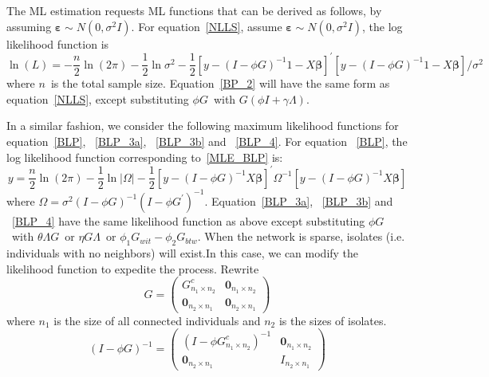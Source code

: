 \documentclass[nojss]{jss}
\begin{document}
The ML estimation requests ML functions that can be derived as follows, by assuming $\mathbf{\varepsilon}\sim N(0,\sigma ^{2}I).$ For equation~\ref{NLLS}, assume $\mathbf{\varepsilon }\sim N(0,\sigma ^{2}I)$, the log likelihood function is
\begin{equation}
\ln \left( L\right) =-\frac{n}{2}\ln \left( 2\pi \right) -\frac{1}{2}\ln
\sigma ^{2}-\frac{1}{2}\left[y-(I-\phi G)^{-1}1-X\mathbf{\beta }%
\right] ^{\prime }\left[ y-(I-\phi G)^{-1}1-X\mathbf{\beta }\right]
/\sigma ^{2}
\end{equation}
where $n$\ is the total sample size. Equation~\ref{BP_2} will have the same form as equation~\ref{NLLS}, except substituting $\phi G$\ with $G(\phi I+\gamma \Lambda)$.

In a similar fashion, we consider the following maximum likelihood functions for equation~\ref{BLP}, ~\ref{BLP_3a}, ~\ref{BLP_3b} and ~\ref{BLP_4}.
For equation ~\ref{BLP}, the log likelihood function corresponding to~\ref{MLE_BLP} is:
\begin{equation}
y=\frac{n}{2}\ln \left( 2\pi \right) -\frac{1}{2}\ln |\Omega |-\frac{1}{2}%
\left[ y-(I-\phi G)^{-1}X\mathbf{\beta }\right] ^{\prime }\Omega ^{-1}\left[
y-(I-\phi G)^{-1}X\mathbf{\beta }\right]  
\label{MLE_BLP}
\end{equation}
where $\Omega =\sigma ^{2}(I-\phi G)^{-1}(I-\phi G^{\prime })^{-1}$. Equation~\ref{BLP_3a}, ~\ref{BLP_3b} and ~\ref{BLP_4} have the same likelihood function as above except substituting $\phi G$\ with $\theta \Lambda G$\ or $\eta G\Lambda $\ or $\phi _{1}G_{wit}-\phi _{2}G_{btw}$.
When the network is sparse, isolates (i.e. individuals with no neighbors) will exist.In this case, we can modify the
likelihood function to expedite the process. Rewrite
\begin{equation}
G=\left( 
\begin{array}{cc}
G_{n_{1}\times n_{2}}^{c} & \mathbf{0}_{n_{1}\times n_{2}} \\ 
\mathbf{0}_{n_{2}\times n_{1}} & \mathbf{0}_{n_{2}\times n_{1}}%
\end{array}\right)
\end{equation}
where $n_{1}$ is the size of all connected individuals and $n_{2}$ is the sizes of isolates.
\begin{equation}
\left( I-\phi G\right) ^{-1}=\left( 
\begin{array}{cc}
\left(I-\phi G_{n_{1}\times n_{2}}^{c}\right) ^{-1} & \mathbf{0}_{n_{1}\times n_{2}}
\\
\mathbf{0}_{n_{2}\times n_{1}} & I_{n_{2}\times n_{1}}
\end{array}\right)
\end{equation}
\end{document}
